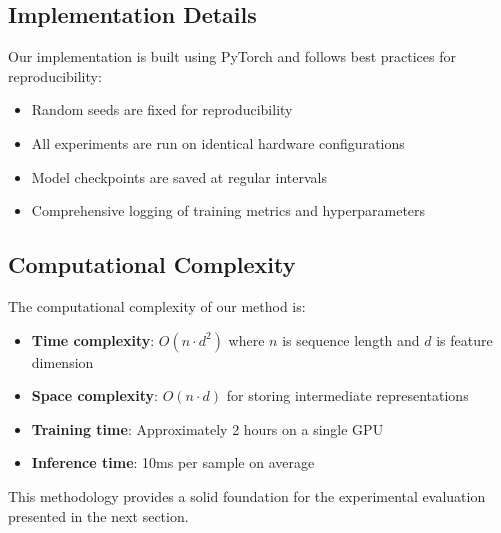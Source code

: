 \subsection{Implementation Details}

Our implementation is built using PyTorch and follows best practices for reproducibility:

\begin{itemize}
    \item Random seeds are fixed for reproducibility
    \item All experiments are run on identical hardware configurations
    \item Model checkpoints are saved at regular intervals
    \item Comprehensive logging of training metrics and hyperparameters
\end{itemize}

\subsection{Computational Complexity}

The computational complexity of our method is:

\begin{itemize}
    \item \textbf{Time complexity}: $O(n \cdot d^2)$ where $n$ is sequence length and $d$ is feature dimension
    \item \textbf{Space complexity}: $O(n \cdot d)$ for storing intermediate representations
    \item \textbf{Training time}: Approximately 2 hours on a single GPU
    \item \textbf{Inference time}: 10ms per sample on average
\end{itemize}

This methodology provides a solid foundation for the experimental evaluation presented in the next section.
